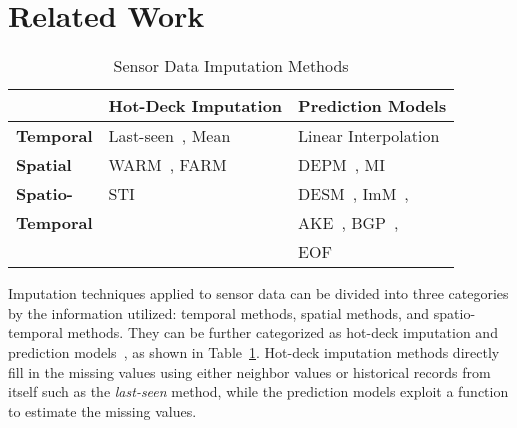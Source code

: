 \section{Related Work}\label{sec:rw}


\begin{table}[h]
\caption{Sensor Data Imputation Methods}
\label{tbl:methods}
\centering
{\small
\begin{tabular}{|l|l|l|} \hline
   &{\bf Hot-Deck Imputation}&{\bf Prediction Models}\\ \hline
{\bf Temporal} & Last-seen~\cite{Granger:lastseen}, Mean & Linear Interpolation\\ \hline
{\bf Spatial} & WARM~\cite{le2005estimating}, FARM~\cite{Gruenwald:FARM} & DEPM~\cite{li2008data}, MI~\cite{yuan2000multiple}\\\hline
{\bf Spatio-} & STI~\cite{Jian-Zhong:STI} & DESM~\cite{li2008data}, ImM~\cite{Lim:robust},\\
{\bf Temporal} &&AKE~\cite{pan2010k}, BGP~\cite{osborne2012real},\\
{ } && EOF~\cite{beckers2003eof, kondrashov2006spatio}\\
 \hline \end{tabular}
}
\vspace{-0.1in}
\end{table}

Imputation techniques applied to sensor data can be divided into three categories by the information utilized:
temporal methods, spatial methods, 
and spatio-temporal methods. They can be further categorized as hot-deck imputation and prediction models~\cite{Garcia:KNNreview},
as shown in Table~\ref{tbl:methods}.
Hot-deck imputation methods directly fill in the missing values using either neighbor values or historical records from itself 
such as the \textit{last-seen} method, while the prediction models exploit a function 
to estimate the missing values. 


